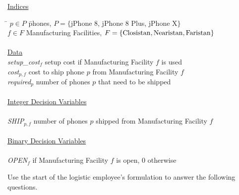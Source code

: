 \documentclass[10pt]{article}
\begin{document}
\noindent\underline{Indices}
\begin{tabbing}
\hspace{.5cm} \= $p\in P$ \hspace{2.5cm} \= phones, $P=\{$jPhone 8, jPhone 8 Plus, jPhone X$\}$ \\
\> $f\in F$ \> Manufacturing Facilities, $F=\{{\rm Closistan,Nearistan,Faristan} \}$\\

\\
\noindent\underline{Data}\\%
\> {\it setup\_cost}$_{f}$ \> setup cost if Manufacturing Facility $f$ is used\\
\> {\it cost}$_{p,f}$ \> cost to ship phone $p$ from Manufacturing Facility $f$ \\
\> {\it required}$_{p}$ \> number of phones $p$ that need to be shipped \\
\\

\noindent\underline{Integer Decision Variables}\\%
\\
\> {\it SHIP}$_{p,f}$ \> number of phones $p$ shipped from Manufacturing Facility $f$  \\
\\
\noindent\underline{Binary Decision Variables}\\%
\\
\> {\it OPEN}$_{f}$  if Manufacturing Facility $f$ is open, 0 otherwise  \\
\end{tabbing}

Use the start of the logistic employee's formulation to answer the following questions.
\end{document}
